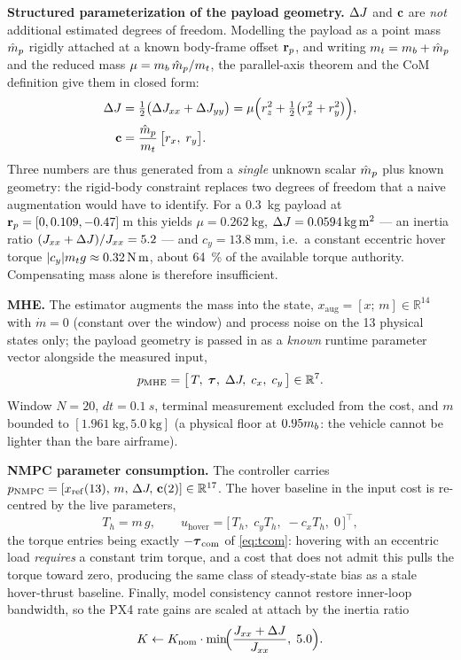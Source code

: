 \documentclass[conference]{IEEEtran}
\begin{document}
\textbf{Structured parameterization of the payload geometry.} $\Delta J$ and $\mathbf{c}$ are
\emph{not} additional estimated degrees of freedom. Modelling the payload as a point mass
$\hat{m}_p$ rigidly attached at a known body-frame offset $\mathbf{r}_p$, and writing
$m_t = m_b + \hat{m}_p$ and the reduced mass $\mu = m_b\,\hat{m}_p / m_t$, the parallel-axis theorem and
the CoM definition give them in closed form:
\begin{align}
\Delta J &= \tfrac12\bigl(\Delta J_{xx} + \Delta J_{yy}\bigr) = \mu\Bigl( r_z^2 + \tfrac12\bigl(r_x^2 + r_y^2\bigr) \Bigr), \label{eq:dj}\\
\mathbf{c} &= \frac{\hat{m}_p}{m_t}\,\bigl[r_x,\; r_y\bigr]. \label{eq:cxy}
\end{align}
Three numbers are thus generated from a \emph{single} unknown scalar $\hat{m}_p$ plus known
geometry: the rigid-body constraint replaces two degrees of freedom that a naive
augmentation would have to identify. For a \SI{0.3}{\kg} payload at
$\mathbf{r}_p = [0, 0.109, -0.47]\,$\si{\meter} this yields $\mu = \SI{0.262}{\kg}$,
$\dJ = \SI{0.0594}{\kg\meter\squared}$ --- an inertia ratio $(J_{xx}+\Delta J)/J_{xx} = 5.2$ ---
and $c_y = \SI{13.8}{\milli\meter}$, i.e.\ a constant eccentric hover torque
$|c_y| m_t g \approx \SI{0.32}{\newton\meter}$, about \SI{64}{\percent} of the available
torque authority. Compensating mass alone is therefore insufficient.

\textbf{MHE.} The estimator augments the mass into the state,
$x_{\mathrm{aug}} = [x;\, m] \in \mathbb{R}^{14}$ with $\dot m = 0$ (constant over the window)
and process noise on the 13 physical states only; the payload geometry is passed in as a
\emph{known} runtime parameter vector alongside the measured input,
\begin{equation}
p_{\mathrm{MHE}} = \bigl[\, T,\; \boldsymbol{\tau},\; \Delta J,\; c_x,\; c_y \,\bigr] \in \mathbb{R}^{7}. \label{eq:pmhe}
\end{equation}
Window $N = 20$, $dt = \SI{0.1}{s}$, terminal measurement excluded from the cost, and $m$
bounded to $[\SI{1.961}{\kg}, \SI{5.0}{\kg}]$ (a physical floor at $0.95m_b$: the vehicle
cannot be lighter than the bare airframe).

\textbf{NMPC parameter consumption.} The controller carries
$p_{\mathrm{NMPC}} = [x_{\mathrm{ref}}(13),\, m,\, \Delta J,\, \mathbf{c}(2)] \in \mathbb{R}^{17}$.
The hover baseline in the input cost is re-centred by the live parameters,
\begin{equation}
T_h = m\,g, \qquad
u_{\mathrm{hover}} = \bigl[\, T_h,\; c_y T_h,\; -c_x T_h,\; 0 \,\bigr]^{\!\top}, \label{eq:hover}
\end{equation}
the torque entries being exactly $-\boldsymbol{\tau}_{\mathrm{com}}$ of \eqref{eq:tcom}: hovering with an eccentric load
\emph{requires} a constant trim torque, and a cost that does not admit this pulls the torque
toward zero, producing the same class of steady-state bias as a stale hover-thrust baseline.
Finally, model consistency cannot restore inner-loop bandwidth, so the PX4 rate gains are
scaled at attach by the inertia ratio
\begin{equation}
K \leftarrow K_{\mathrm{nom}} \cdot \min\!\Bigl( \frac{J_{xx} + \Delta J}{J_{xx}},\; 5.0 \Bigr). \label{eq:gain}
\end{equation}
\end{document}
